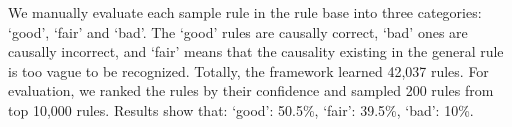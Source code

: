 
We manually evaluate each sample rule in the rule base into three categories: `good', `fair' and `bad'. 
The `good' rules are causally correct, `bad' ones are causally incorrect, and `fair' means that the causality existing in the general rule is too vague to be recognized. Totally, the framework learned 42,037 rules. For evaluation, we ranked the rules by their confidence and sampled 200 rules from top 10,000 rules. Results show that: `good': 50.5\%, `fair': 39.5\%, `bad': 10\%.